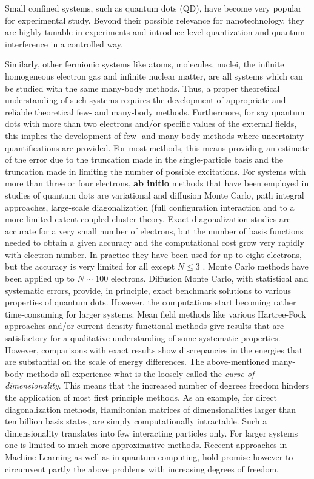 \documentclass[%
oneside,                 %
final,                   %
10pt]{article}
\begin{document}
Small confined systems, such as quantum dots (QD), have become very
popular for experimental study.  Beyond their possible relevance for
nanotechnology, they are highly tunable in experiments and introduce
level quantization and quantum interference in a controlled way.

Similarly, other fermionic systems like atoms, molecules, nuclei, the
infinite homogeneous electron gas and infinite nuclear matter, are all
systems which can be studied with the same many-body methods.
Thus, a proper theoretical understanding of such systems requires the
development of appropriate and reliable theoretical few- and many-body
methods.  Furthermore, for say quantum dots with more than two electrons
and/or specific values of the external fields, this implies the
development of few- and many-body methods where uncertainty
quantifications are provided.  For most methods, this means providing
an estimate of the error due to the truncation made in the
single-particle basis and the truncation made in limiting the number
of possible excitations.  For systems with more than three or four
electrons, \textbf{ab initio} methods that have been employed in studies of
quantum dots are variational and diffusion Monte Carlo, path integral
approaches, large-scale diagonalization (full configuration
interaction and to a more limited extent coupled-cluster theory.
Exact diagonalization studies are accurate for a very small number of
electrons, but the number of basis functions needed to obtain a given
accuracy and the computational cost grow very rapidly with electron
number.  In practice they have been used for up to eight electrons,
but the accuracy is very limited for all except $N\le 3$ .  Monte
Carlo methods have been applied up to $N\sim 100$ electrons. Diffusion
Monte Carlo, with statistical and systematic errors, provide, in
principle, exact benchmark solutions to various properties of quantum
dots. However, the computations start becoming rather time-consuming
for larger systems.  Mean field methods like various Hartree-Fock
approaches and/or current density functional methods give results that
are satisfactory for a qualitative understanding of some systematic
properties. However, comparisons with exact results show discrepancies
in the energies that are substantial on the scale of energy
differences. The above-mentioned many-body methods all experience what
is the loosely called the \emph{curse of dimensionality}. This means that
the increased number of degrees freedom hinders the application of
most first principle methods. As an example, for direct
diagonalization methods, Hamiltonian matrices of dimensionalities
larger than ten billion basis states, are simply computationally
intractable. Such a dimensionality translates into few interacting
particles only. For larger systems one is limited to much more
approximative methods.  Reecent approaches in Machine Learning as well
as in quantum computing, hold promise however to circumvent partly the
above problems with increasing degrees of freedom.
\end{document}
